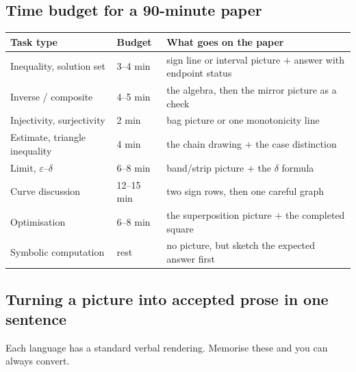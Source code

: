 \subsection{Time budget for a 90-minute paper}

\begin{center}
\small
\begin{tabular}{@{}p{4.6cm}p{2.4cm}p{7.4cm}@{}}
\toprule
Task type & Budget & What goes on the paper \\
\midrule
Inequality, solution set & 3--4 min & sign line or interval picture $+$ answer with
  endpoint status \\
Inverse / composite & 4--5 min & the algebra, then the mirror picture as a check \\
Injectivity, surjectivity & 2 min & bag picture or one monotonicity line \\
Estimate, triangle inequality & 4 min & the chain drawing $+$ the case distinction \\
Limit, $\varepsilon$--$\delta$ & 6--8 min & band/strip picture $+$ the $\delta$ formula \\
Curve discussion & 12--15 min & two sign rows, then one careful graph \\
Optimisation & 6--8 min & the superposition picture $+$ the completed square \\
Symbolic computation & rest & no picture, but sketch the expected answer first \\
\bottomrule
\end{tabular}
\end{center}

\subsection{Turning a picture into accepted prose in one sentence}

Each language has a standard verbal rendering. Memorise these and you can always convert.

